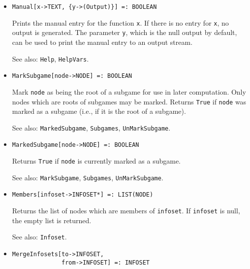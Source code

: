 \begin{itemize}

\item{}
\protect \large \begin{verbatim}
Manual[x->TEXT, {y->(Output)}] =: BOOLEAN 
\end{verbatim} \normalsize

\bd 
Prints the manual entry for the function \verb+x+.  If there is no
entry for \verb+x+, no output is generated. The parameter
\verb+y+, which is the null output by default, can be used to print
the manual entry to an output stream.
\item [See also:] \verb+Help+, \verb+HelpVars+.
\ed

\item{}
\protect \large \begin{verbatim}
MarkSubgame[node->NODE] =: BOOLEAN 
\end{verbatim} \normalsize

\bd
Mark \verb+node+ as being the root of a subgame for use in later computation.
Only nodes which are roots of subgames may be marked.  Returns \verb+True+
if \verb+node+ was marked as a subgame (i.e., if it is the root of a subgame).
\item [See also:] \verb+MarkedSubgame+, \verb+Subgames+,
\verb+UnMarkSubgame+.
\ed


\item{}
\protect \large \begin{verbatim}
MarkedSubgame[node->NODE] =: BOOLEAN 
\end{verbatim} \normalsize

\bd
Returns \verb+True+ if \verb+node+ is currently marked as a subgame. 
\item [See also:] \verb+MarkSubgame+, \verb+Subgames+, \verb+UnMarkSubgame+.
\ed


\item{}
\protect \large \begin{verbatim}
Members[infoset->INFOSET*] =: LIST(NODE) 
\end{verbatim}\normalsize

\bd
Returns the list of nodes which are members of \verb+infoset+.  If
\verb+infoset+ is null, the empty list is returned.
\item [See also:] \verb+Infoset+.
\ed

\item{}
\protect \large \begin{verbatim}
MergeInfosets[to->INFOSET,
              from->INFOSET] =: INFOSET
\end{verbatim}\normalsize


\end{itemize}
